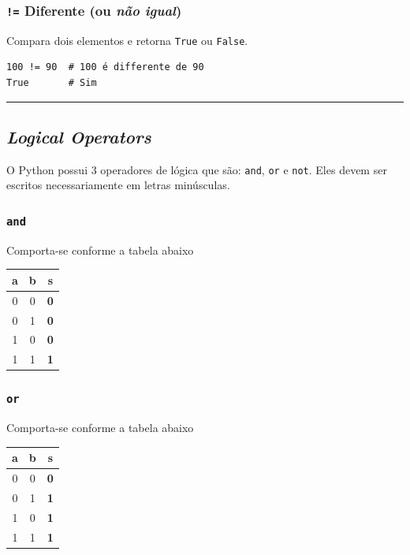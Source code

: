 \documentclass[]{book}
\begin{document}
\subsubsection{\texorpdfstring{\texttt{!=} Diferente (ou \emph{não
igual})}{!= Diferente (ou não igual)}}\label{diferente-ou-nao-igual}

Compara dois elementos e retorna \texttt{True} ou \texttt{False}.

\begin{verbatim}
100 != 90  # 100 é differente de 90
True       # Sim
\end{verbatim}

\begin{center}\rule{0.5\linewidth}{\linethickness}\end{center}

\subsection{\texorpdfstring{\emph{Logical
Operators}}{Logical Operators}}\label{logical-operators}

O Python possui 3 operadores de lógica que são: \texttt{and},
\texttt{or} e \texttt{not}. Eles devem ser escritos necessariamente em
letras minúsculas.

\subsubsection{\texorpdfstring{\texttt{and}}{and}}\label{and}

Comporta-se conforme a tabela abaixo

\begin{longtable}[]{@{}ccc@{}}
\toprule
a & b & \textbf{s}\tabularnewline
\midrule
\endhead
0 & 0 & \textbf{0}\tabularnewline
0 & 1 & \textbf{0}\tabularnewline
1 & 0 & \textbf{0}\tabularnewline
1 & 1 & \textbf{1}\tabularnewline
\bottomrule
\end{longtable}

\subsubsection{\texorpdfstring{\texttt{or}}{or}}\label{or}

Comporta-se conforme a tabela abaixo

\begin{longtable}[]{@{}ccc@{}}
\toprule
a & b & \textbf{s}\tabularnewline
\midrule
\endhead
0 & 0 & \textbf{0}\tabularnewline
0 & 1 & \textbf{1}\tabularnewline
1 & 0 & \textbf{1}\tabularnewline
1 & 1 & \textbf{1}\tabularnewline
\bottomrule
\end{longtable}
\end{document}
